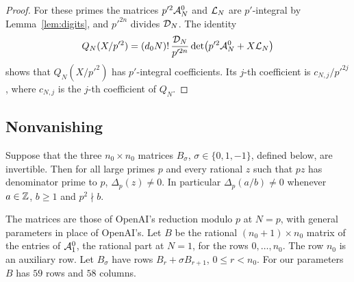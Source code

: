 \begin{proof}
For these primes the matrices $p'^2\mathcal A^0_N$ and $\mathcal L_N$ are $p'$-integral by Lemma~\ref{lem:digits}, and
$p'^{2n}$ divides $\mathcal D_N$. The identity
\[
 Q_N(X/p'^2)=(d_0N)!\,\frac{\mathcal D_N}{p'^{2n}}\det\bigl(p'^2\mathcal A^0_N+X\mathcal L_N\bigr)
\]
shows that $Q_N(X/p'^2)$ has $p'$-integral coefficients. Its $j$-th coefficient is $c_{N,j}/p'^{2j}$, where
$c_{N,j}$ is the $j$-th coefficient of $Q_N$.
\end{proof}

\subsection{Nonvanishing}
\begin{proposition}\label{prop:nonvanishing}
Suppose that the three $n_0\times n_0$ matrices $B_\sigma$, $\sigma\in\{0,1,-1\}$, defined below, are
invertible. Then for all large primes $p$ and every rational $z$ such that $pz$ has denominator prime to
$p$, $\Delta_p(z)\ne0$. In particular $\Delta_p(a/b)\ne0$ whenever $a\in\mathbb Z$, $b\ge1$ and $p^2\nmid b$.
\end{proposition}

The matrices are those of OpenAI's reduction modulo $p$ at $N=p$, with general parameters in place of
OpenAI's. Let $B$ be the rational $(n_0+1)\times n_0$ matrix of the entries of $\mathcal A^0_1$, the rational part at
$N=1$, for the rows $0,\dots,n_0$. The row $n_0$ is an auxiliary row. Let $B_\sigma$ have rows
$B_r+\sigma B_{r+1}$, $0\le r<n_0$. For our parameters $B$ has $59$ rows and $58$ columns.

